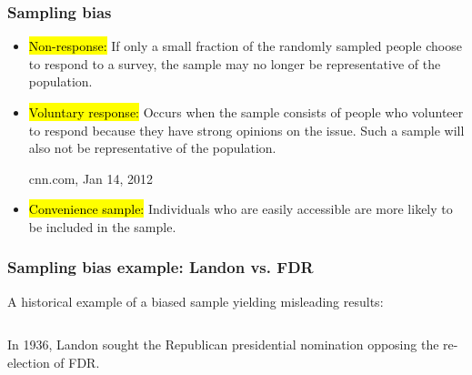 \documentclass[slidestop,compress,mathserif]{beamer}
\begin{document}
\begin{frame}
\frametitle{Sampling bias}

\begin{itemize}

\item \hl{Non-response:} If only a small fraction of the randomly sampled people choose to respond to a survey, the sample may no longer be representative of the population.

\pause

\item \hl{Voluntary response:} Occurs when the sample consists of people who volunteer to respond because they have strong opinions on the issue. Such a sample will also not be representative of the population.

\pause

\begin{center}
{\tiny cnn.com, Jan 14, 2012}
\end{center}

\pause

\item \hl{Convenience sample:} Individuals who are easily accessible are more likely to be included in the sample.

\end{itemize}

\end{frame}


\begin{frame}
\frametitle{Sampling bias example: Landon vs. FDR}

A historical example of a biased sample yielding misleading results: \\

$\:$ \\

\begin{columns}[c]



In 1936, Landon sought the Republican presidential nomination opposing the re-election of FDR.



\end{columns}

\end{frame}
\end{document}
